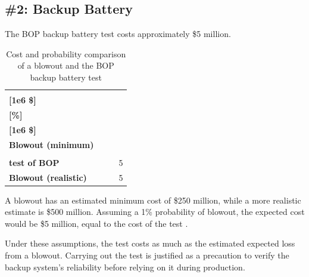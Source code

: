 \documentclass{article}
\begin{document}
\subsection*{\#2: Backup Battery}
The BOP backup battery test costs approximately \$5 million.

\begin{table}[H]
    \centering
    \caption{Cost and probability comparison of a blowout and the BOP backup battery test}
    \label{tab:backup-battery}
    \renewcommand{\arraystretch}{1.4}
    \setlength{\extrarowheight}{4pt}
    \begin{tabularx}{0.92\linewidth}{>{\raggedright\arraybackslash}X *{3}{>{\centering\arraybackslash}X}}
        \toprule
        & \makecell[c]{\textbf{Cost}\\\textbf{[1e6 \$]}} & \makecell[c]{\textbf{Estimated chance}\\\textbf{[\%]}} & \makecell[c]{\textbf{Normalized cost}\\\textbf{[1e6 \$]}}\\
        \midrule
        \textbf{Blowout (minimum)} & 250 & 1 & 2.5\\
        \makecell[l]{\textbf{Backup Battery}\\\textbf{test of BOP}} & 5 & 100 & \cellcolor{backupBatteryGreen}5\\
        \textbf{Blowout (realistic)} & 500 & 1 & \cellcolor{backupBatteryGreen}5\\
        \bottomrule
    \end{tabularx}
\end{table}


A blowout has an estimated minimum cost of \$250 million, while a
more realistic estimate is \$500 million.
Assuming a 1\% probability of blowout, the expected cost would be
\$5 million, equal to the cost of the test .

Under these assumptions, the test costs as much as the estimated expected
loss from a blowout. Carrying out the test is justified as a precaution
to verify the backup system's reliability before relying on it during production.

\newpage
\noindent{}
\end{document}
